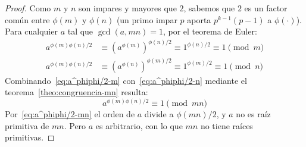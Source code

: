   \begin{proof}
    Como \(m\) y \(n\) son impares y mayores que \(2\),
    sabemos que \(2\)
    es un factor común entre \(\phi(m)\) y \(\phi(n)\)
    (un primo impar \(p\)
     aporta \(p^{k - 1} (p - 1)\) a \(\phi(\cdot)\)).
    Para cualquier \(a\) tal que \(\gcd(a, m n) = 1\),
    por el teorema de Euler:
    \begin{align}
      a^{\phi(m) \phi(n) / 2}
	&\equiv \left(a^{\phi(m)}\right)^{\phi(n) / 2}
	   \equiv 1^{\phi(n) / 2}
	   \equiv 1 \pmod{m}  \label{eq:a^phiphi/2-m} \\
      a^{\phi(m) \phi(n) / 2}
	&\equiv \left(a^{\phi(n)}\right)^{\phi(m) / 2}
	   \equiv 1^{\phi(m) / 2}
	   \equiv 1 \pmod{n} \label{eq:a^phiphi/2-n}
    \end{align}
    Combinando~\eqref{eq:a^phiphi/2-m} con~\eqref{eq:a^phiphi/2-n}
    mediante el teorema~\ref{theo:congruencia-mn}
    resulta:
    \begin{equation}
      \label{eq:a^phiphi/2-mn}
      a^{\phi(m) \phi(n) / 2} \equiv 1 \pmod{m n}
    \end{equation}
    Por~\eqref{eq:a^phiphi/2-mn}
    el orden de \(a\) divide a \(\phi(m n) / 2\),
    y \(a\) no es raíz primitiva de \(m n\).
    Pero \(a\) es arbitrario,
    con lo que \(m n\) no tiene raíces primitivas.
  \end{proof}

